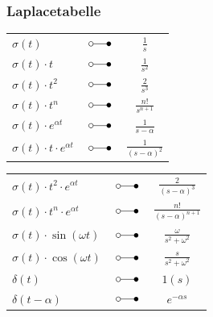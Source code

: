 \subsubsection{Laplacetabelle}
\begin{multicols}{2}
	\begin{center}
		\begin{tabular}{|lcc|}
			\hline
			$\sigma \left( t \right)$ & $\; \laplace \;$ & $\frac{1}{s}$ \\
			$\sigma \left( t \right) \cdot t$ & $\; \laplace \;$ & $\frac{1}{s^2}$\\
			$\sigma \left( t \right) \cdot t^2$ & $\; \laplace \;$ & $\frac{2}{s^3}$\\
			$\sigma \left( t \right) \cdot t^n$ & $\; \laplace \;$ & $\frac{n!}{s^{n+1}}$\\
			$\sigma \left( t \right) \cdot e^{\alpha t}$ & $\; \laplace \;$ &
			$\frac{1}{s-\alpha}$\\
			$\sigma \left( t \right) \cdot t \cdot e^{\alpha t}$ & $\; \laplace \;$ &
			$\frac{1}{( s - \alpha )^2}$\\
			\hline
		\end{tabular}
	\end{center}
	\columnbreak
	\begin{center}
		\begin{tabular}{|lcc|}
			\hline
			$\sigma \left( t \right)\cdot t^2 \cdot e^{\alpha t}$ &
			$\; \laplace \;$ & $\frac{2}{{( s - \alpha )}^3}$\\
			$\sigma \left( t \right)\cdot t^n \cdot e^{ \alpha t}$ &
			$\; \laplace \;$ & $\frac{n!}{(s-\alpha)^{n+1}}$\\
			$\sigma \left( t \right) \cdot \sin \left(\omega t \right)$ & $\; \laplace \;$ &
			$\frac{\omega}{s^2 + {\omega^2}}$\\
			$\sigma \left( t \right) \cdot \cos \left( \omega t \right)$ & $\; \laplace \;$ &
			$\frac{s}{ s^2 + \omega^2}$\\
			$\delta \left( t \right)$ & $\; \laplace \;$ & $1\left( s \right)$ \\
			$\delta \left( t - \alpha \right)$ & $\; \laplace \;$ & $e^{- \alpha s}$\\
			\hline
		\end{tabular}
	\end{center}
\end{multicols}

